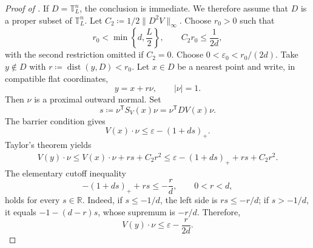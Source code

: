 \documentclass[10pt,a4paper]{amsart}
\newcommand{\R}{\mathbb R}
\newcommand{\T}{\mathbb T}
\newcommand{\dist}{\operatorname{dist}}
\newcommand{\e}{\varepsilon}
\begin{document}
\begin{proof}[Proof of ]
If $D=\T_L^n$, the conclusion is immediate. We therefore assume that
$D$ is a proper subset of $\T_L^n$. Let
  $C_2\coloneqq 1/2\|D^2V\|_\infty$.
Choose $r_0>0$ such that
\[
  r_0<\min\left\{d,\frac L2\right\},
  \qquad
  C_2r_0\le\frac1{2d},
\]
with the second restriction omitted if $C_2=0$.  Choose $0<\e_0<r_0/(2d)$.
Take $y\notin D$ with
  $r\coloneqq \dist(y,D)<r_0$.
Let $x\in D$ be a nearest point and write, in compatible flat
coordinates,
\[
  y=x+r\nu,
  \qquad |\nu|=1.
\]
Then $\nu$ is a proximal outward normal. Set
\[
  s\coloneqq
  \nu^{\mathsf T}S_V(x)\nu
  =
  \nu^{\mathsf T}DV(x)\nu.
\]
The barrier condition gives
\[
  V(x)\cdot \nu
  \le\e-(1+ds)_+.
\]
Taylor's theorem yields
\begin{align*}
  V(y)\cdot \nu
  \le V(x)\cdot \nu+rs+C_2r^2\le\e-(1+ds)_++rs+C_2r^2.
\end{align*}
The elementary cutoff inequality
\begin{equation*}
  -(1+ds)_++rs\le-\frac rd,
  \qquad 0<r<d,
\end{equation*}
holds for every $s\in\R$.  Indeed, if $s\le-1/d$, the left side is $rs\le-r/d$; if $s>-1/d$, it equals $-1-(d-r)s$, whose supremum is $-r/d$.  Therefore,
\begin{equation}\label{eq:drift-app}
  V(y)\cdot \nu
  \le\e-\frac r{2d}.
\end{equation}


\end{proof}
\end{document}
